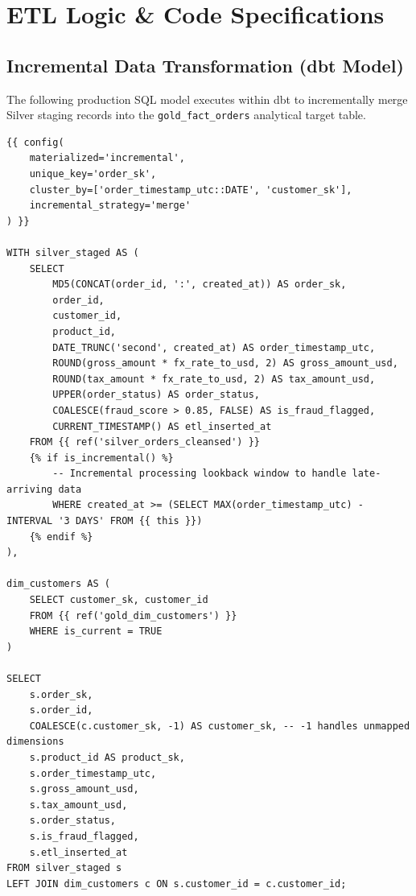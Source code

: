 \documentclass[10pt, a4paper]{article}
\begin{document}
\section{ETL Logic \& Code Specifications}

\subsection{Incremental Data Transformation (dbt Model)}
The following production SQL model executes within dbt to incrementally merge Silver staging records into the \texttt{gold\_fact\_orders} analytical target table.

\vspace{2pt}

\begin{lstlisting}[style=sqlstyle, caption={dbt Model: \texttt{models/gold/gold\_fact\_orders.sql}}]
{{ config(
    materialized='incremental',
    unique_key='order_sk',
    cluster_by=['order_timestamp_utc::DATE', 'customer_sk'],
    incremental_strategy='merge'
) }}

WITH silver_staged AS (
    SELECT 
        MD5(CONCAT(order_id, ':', created_at)) AS order_sk,
        order_id,
        customer_id,
        product_id,
        DATE_TRUNC('second', created_at) AS order_timestamp_utc,
        ROUND(gross_amount * fx_rate_to_usd, 2) AS gross_amount_usd,
        ROUND(tax_amount * fx_rate_to_usd, 2) AS tax_amount_usd,
        UPPER(order_status) AS order_status,
        COALESCE(fraud_score > 0.85, FALSE) AS is_fraud_flagged,
        CURRENT_TIMESTAMP() AS etl_inserted_at
    FROM {{ ref('silver_orders_cleansed') }}
    {% if is_incremental() %}
        -- Incremental processing lookback window to handle late-arriving data
        WHERE created_at >= (SELECT MAX(order_timestamp_utc) - INTERVAL '3 DAYS' FROM {{ this }})
    {% endif %}
),

dim_customers AS (
    SELECT customer_sk, customer_id 
    FROM {{ ref('gold_dim_customers') }} 
    WHERE is_current = TRUE
)

SELECT 
    s.order_sk,
    s.order_id,
    COALESCE(c.customer_sk, -1) AS customer_sk, -- -1 handles unmapped dimensions
    s.product_id AS product_sk,
    s.order_timestamp_utc,
    s.gross_amount_usd,
    s.tax_amount_usd,
    s.order_status,
    s.is_fraud_flagged,
    s.etl_inserted_at
FROM silver_staged s
LEFT JOIN dim_customers c ON s.customer_id = c.customer_id;
\end{lstlisting}
\end{document}
